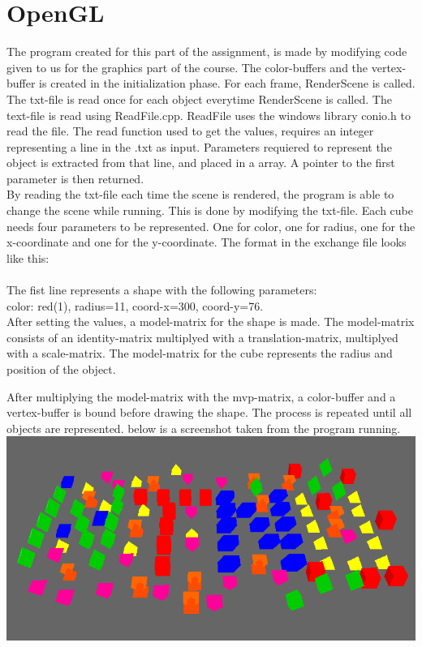 \lstset{language = c}
\section{OpenGL}
The program created for this part of the assignment, 
is made by modifying code given to us for the graphics part of the course. 
The color-buffers and the vertex-buffer is created in the initialization phase. 
For each frame, RenderScene is called. 
The txt-file is read once for each object everytime RenderScene is called.
The text-file is read using ReadFile.cpp.
ReadFile uses the windows library conio.h to read the file. 
The read function used to get the values, requires an integer representing a line in the .txt as input.
Parameters requiered to represent the object is extracted from that line, and placed in a array.
A pointer to the first parameter is then returned.
\\
By reading the txt-file each time the scene is rendered, the program is able to change the scene while running.
This is done by modifying the txt-file. 
Each cube needs four parameters to be represented.
One for color, one for radius, one for the x-coordinate and one for the y-coordinate. The format in the exchange file looks like this:
\\

\\
The fist line represents a shape with the following parameters:
\\color: red(1), radius=11, coord-x=300, coord-y=76.
\\
After setting the values, a model-matrix for the shape is made. 
The model-matrix consists of an identity-matrix multiplyed with a translation-matrix, multiplyed with a scale-matrix. 
The model-matrix for the cube represents the radius and position of the object.
 
After multiplying the model-matrix with the mvp-matrix, a color-buffer and a vertex-buffer is bound before drawing the shape.
The process is repeated until all objects are represented. 
below is a screenshot taken from the program running.
\\
\includegraphics[scale=0.75]{Screen1.png}


